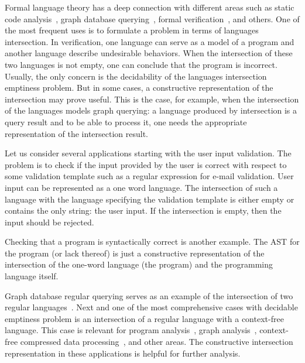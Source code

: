 \documentclass[runningheads]{llncs}
\begin{document}
Formal language theory has a deep connection with different areas such as static code analysis~\cite{Reps:1995:PID:199448.199462,vardoulakis2010cfa2,Yan:2011:DCA:2001420.2001440,rehof2001type,lu2013incremental,pratikakis2006existential,zhang2017context}, graph database querying~\cite{hellingsRelational,hellingsPathQuerying,zhang2016context,koschmieder2012regular}, formal verification~\cite{10.1007/11730637_17,10.1007/3-540-63141-0_10}, and others.
One of the most frequent uses is to formulate a problem in terms of languages intersection.
In verification, one language can serve as a model of a program and another language describe undesirable behaviors.
When the intersection of these two languages is not empty, one can conclude that the program is incorrect.
Usually, the only concern is the decidability of the languages intersection emptiness problem.
But in some cases, a constructive representation of the intersection may prove useful.
This is the case, for example, when the intersection of the languages models graph querying: a language produced by intersection is a query result and to be able to process it, one needs the appropriate representation of the intersection result.

Let us consider several applications starting with the user input validation.
The problem is to check if the input provided by the user is correct with respect to some validation template such as a regular expression for e-mail validation.
User input can be represented as a one word language.
The intersection of such a language with the language specifying the validation template is either empty or contains the only string: the user input.
If the intersection is empty, then the input should be rejected.

Checking that a program is syntactically correct is another example.
The AST for the program (or lack thereof) is just a constructive representation of the intersection of the one-word language (the program) and the programming language itself.

Graph database regular querying serves as an example of the intersection of two regular languages~\cite{ABITEBOUL1999428,koschmieder2012regular,alkhateeb:tel-00293206}.
Next and one of the most comprehensive cases with decidable emptiness problem is an intersection of a regular language with a context-free language.
This case is relevant for program analysis~\cite{Reps:1995:PID:199448.199462,vardoulakis2010cfa2,Yan:2011:DCA:2001420.2001440}, graph analysis~\cite{hellingsPathQuerying,zhang2016context,grigorev2016context}, context-free compressed data processing~\cite{MANETH201819}, and other areas.
The constructive intersection representation in these applications is helpful for further analysis.
\end{document}
